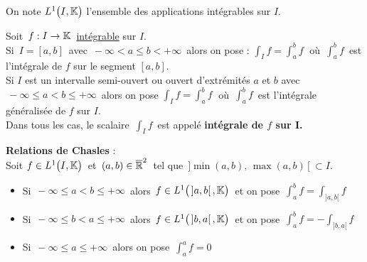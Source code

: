 On note \(L^1\bigl(I,\mathbb{K}\bigr)\) l'ensemble des applications intégrables sur $I$.

\vspace{2cm}

Soit \(\,f:I\to \mathbb{K}\,\) \underline{intégrable} sur $I$.\vspace{-0.2cm}\\
Si \(\,I=[a,b]\,\) avec \(\,-\infty<a\leq b<+\infty\,\) alors on pose : \(\!\displaystyle \int_{I}f=\int_{a}^{b}\!f\;\) où \(\,\displaystyle\int_{a}^{b}\!f\,\) est l'intégrale de $f$ sur le segment \([a,b]\).\vspace{0.1cm}\\
Si $I$ est un intervalle semi-ouvert ou ouvert d'extrémités $a$ et $b$ avec \(\,-\infty\leq a <b\leq+\infty\,\) alors on pose \(\!\displaystyle \int_{I}f=\int_{a}^{b}\!f\;\) où \(\,\displaystyle\int_{a}^{b}\!f\,\) est l'intégrale généralisée de $f$ sur $I$.\vspace{0.1cm}\\
Dans tous les cas, le scalaire \(\,\displaystyle\int_I f\,\) est appelé \textbf{intégrale de $f$ sur I.}

\vspace{2cm}

\textbf{Relations de Chasles} : \vspace{0.2cm}\\
Soit \(f\in L^1\bigl(I,\mathbb{K}\bigr)\,\) et \(\,(a,b)\in\overline{\mathbb{R}}^2\:\) tel que \(\,]\min(a,b),\,\max(a,b)\,[\ \subset I.\)
\begin{itemize}[leftmargin=1.5cm, label=•]
    \item Si \(\,-\infty\leq a<b \leq+\infty\,\) alors \(\,f\in L^1\bigl(\,]a,b[\,,\mathbb{K}\bigr)\,\) et on pose \(\,\displaystyle \int_{a}^{b}\!f=\int_{]a,b[}f\)
    
    \item Si \(\,-\infty\leq b<a \leq+\infty\,\) alors \(\,f\in L^1\bigl(\,]b,a[\,,\mathbb{K}\bigr)\,\) et on pose \(\,\displaystyle \int_{a}^{b}\!f=-\!\int_{]b,a[}f\)\vspace{-0.2cm}
    
    \item Si \(\,-\infty\leq a \leq+\infty\,\) alors on pose \(\,\displaystyle\int_{a}^{a}\!f=0\)
\end{itemize}

\newpage

